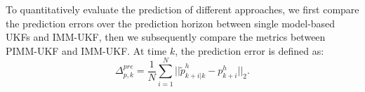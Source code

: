 \documentclass[journal]{IEEEtran}
\DeclareRobustCommand{\clnote}[1]{\ifthenelse{\boolean{include-notes}}%
{\textcolor{orange}{\textbf{CL: #1}}}{}}
\begin{document}
    To quantitatively evaluate the prediction of different approaches, we first compare the prediction errors over the prediction horizon between single model-based UKFs and IMM-UKF, then we subsequently compare the metrics between PIMM-UKF and IMM-UKF.
	At time $k$, the prediction error is defined as:
	\begin{equation}
		\Delta^{pre}_{p,k}=\frac{1}{N}\sum\limits_{i=1}^{N}||\tilde{p}^h_{k+i|k}-p^h_{k+i}||_2.\label{eqn:pred_err} \nonumber
	\end{equation}

	
\end{document}
